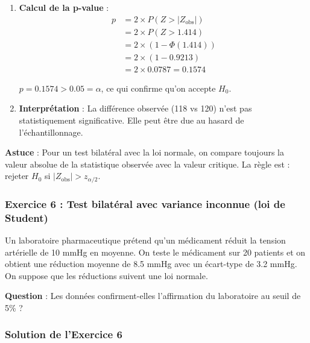 \documentclass[11pt,a4paper]{article}
\begin{document}
\begin{enumerate}
    \item \textbf{Calcul de la p-value} :
    \begin{align*}
    p &= 2 \times P(Z > |Z_{\text{obs}}|) \\
    &= 2 \times P(Z > 1.414) \\
    &= 2 \times (1 - \Phi(1.414)) \\
    &= 2 \times (1 - 0.9213) \\
    &= 2 \times 0.0787 = 0.1574
    \end{align*}
    
    $p = 0.1574 > 0.05 = \alpha$, ce qui confirme qu'on accepte $H_0$.
    
    \item \textbf{Interprétation} : La différence observée (118 vs 120) n'est pas statistiquement significative. Elle peut être due au hasard de l'échantillonnage.
\end{enumerate}

\begin{astucebox}
\textbf{Astuce} : Pour un test bilatéral avec la loi normale, on compare toujours la valeur absolue de la statistique observée avec la valeur critique. La règle est : rejeter $H_0$ si $|Z_{\text{obs}}| > z_{\alpha/2}$.
\end{astucebox}

\newpage

\subsubsection{Exercice 6 : Test bilatéral avec variance inconnue (loi de Student)}

Un laboratoire pharmaceutique prétend qu'un médicament réduit la tension artérielle de 10 mmHg en moyenne. On teste le médicament sur 20 patients et on obtient une réduction moyenne de 8.5 mmHg avec un écart-type de 3.2 mmHg. On suppose que les réductions suivent une loi normale.

\textbf{Question} : Les données confirment-elles l'affirmation du laboratoire au seuil de 5\% ?

\subsubsection*{Solution de l'Exercice 6}
\end{document}
